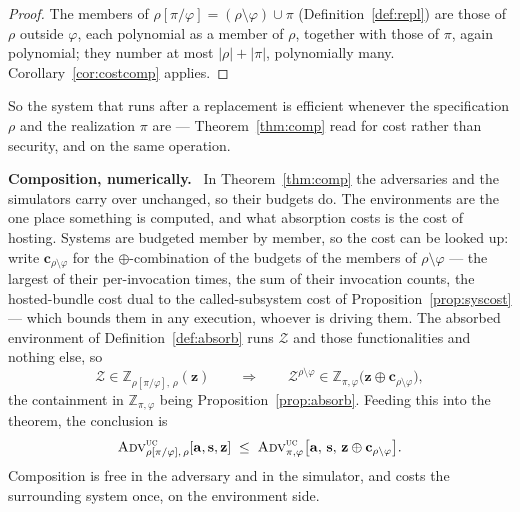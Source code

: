 \documentclass[11pt,a4paper]{article}
\newcommand{\Zenv}{\mathcal{Z}}
\newcommand{\bd}[1]{\mathbf{#1}}
\newcommand{\advtg}{\op{Adv}}
\newcommand{\ZenvSet}{\mathbb{Z}}
\newcommand{\op}[1]{\textsc{#1}}
\newcommand{\heading}[1]{\medskip\par\noindent\textcolor{accent}{\textbf{#1.}}\ }
\theoremstyle{accentdef}
\theoremstyle{accentplain}
\begin{document}
\begin{proof}
The members of $\rho[\pi/\varphi] = (\rho \setminus \varphi) \cup \pi$ (Definition~\ref{def:repl})
are those of $\rho$ outside $\varphi$, each polynomial as a member of $\rho$, together with those
of $\pi$, again polynomial; they number at most $|\rho| + |\pi|$, polynomially many.
Corollary~\ref{cor:costcomp} applies.
\end{proof}

So the system that runs after a replacement is efficient whenever the specification $\rho$ and the
realization $\pi$ are --- Theorem~\ref{thm:comp} read for cost rather than security, and on the
same operation.

\heading{Composition, numerically} In Theorem~\ref{thm:comp} the adversaries and the simulators
carry over unchanged, so their budgets do. The environments are the one place something is
computed, and what absorption costs is the cost of hosting. Systems are budgeted member by member, so the cost can be
looked up: write $\bd{c}_{\rho \setminus \varphi}$ for the $\oplus$-combination of the budgets of
the members of $\rho \setminus \varphi$ --- the largest of their per-invocation times, the sum of
their invocation counts, the hosted-bundle cost dual to the called-subsystem cost of
Proposition~\ref{prop:syscost} --- which bounds them in any execution, whoever is driving them. The
absorbed environment of Definition~\ref{def:absorb} runs
$\Zenv$ and those functionalities and nothing else, so
\[
  \Zenv \in \ZenvSet_{\rho[\pi/\varphi],\,\rho}(\bd{z})
  \qquad\Longrightarrow\qquad
  \Zenv^{\rho \setminus \varphi} \in \ZenvSet_{\pi,\varphi}\bigl(\bd{z} \oplus \bd{c}_{\rho \setminus \varphi}\bigr) ,
\]
the containment in $\ZenvSet_{\pi,\varphi}$ being Proposition~\ref{prop:absorb}. Feeding this
into the theorem, the conclusion is
\[
  \advtg^{\op{uc}}_{\rho[\pi/\varphi],\,\rho}[\bd{a},\bd{s},\bd{z}]
  \;\leq\;
  \advtg^{\op{uc}}_{\pi,\varphi}\bigl[\bd{a},\,\bd{s},\,\bd{z} \oplus \bd{c}_{\rho \setminus \varphi}\bigr] .
\]
Composition is free in the adversary and in the simulator, and costs the surrounding system
once, on the environment side.
\end{document}
